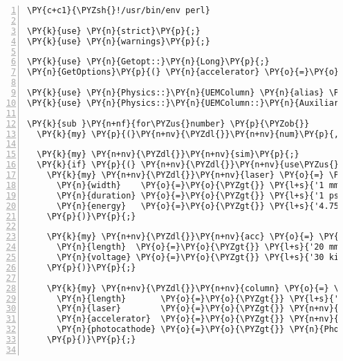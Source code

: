 \begin{Verbatim}[commandchars=\\\{\},numbers=left,firstnumber=1,stepnumber=1]
\PY{c+c1}{\PYZsh{}!/usr/bin/env perl}

\PY{k}{use} \PY{n}{strict}\PY{p}{;}
\PY{k}{use} \PY{n}{warnings}\PY{p}{;}

\PY{k}{use} \PY{n}{Getopt::}\PY{n}{Long}\PY{p}{;}
\PY{n}{GetOptions}\PY{p}{(} \PY{n}{accelerator} \PY{o}{=}\PY{o}{\PYZgt{}} \PY{o}{\PYZbs{}}\PY{k}{my} \PY{n+nv}{\PYZdl{}}\PY{n+nv}{use\PYZus{}acc} \PY{p}{)}\PY{p}{;}

\PY{k}{use} \PY{n}{Physics::}\PY{n}{UEMColumn} \PY{n}{alias} \PY{o}{=}\PY{o}{\PYZgt{}} \PY{p}{[}\PY{l+s+sx}{qw/:standard Pulse/}\PY{p}{]}\PY{p}{;}
\PY{k}{use} \PY{n}{Physics::}\PY{n}{UEMColumn::}\PY{n}{Auxiliary} \PY{l+s+sx}{qw/:materials :constants/}\PY{p}{;}

\PY{k}{sub }\PY{n+nf}{for\PYZus{}number} \PY{p}{\PYZob{}}
  \PY{k}{my} \PY{p}{(}\PY{n+nv}{\PYZdl{}}\PY{n+nv}{num}\PY{p}{,} \PY{n+nv}{\PYZdl{}}\PY{n+nv}{use\PYZus{}acc}\PY{p}{)} \PY{o}{=} \PY{n+nv}{@}\PY{n+nv}{\PYZus{}}\PY{p}{;}

  \PY{k}{my} \PY{n+nv}{\PYZdl{}}\PY{n+nv}{sim}\PY{p}{;}
  \PY{k}{if} \PY{p}{(} \PY{n+nv}{\PYZdl{}}\PY{n+nv}{use\PYZus{}acc} \PY{p}{)} \PY{p}{\PYZob{}}
    \PY{k}{my} \PY{n+nv}{\PYZdl{}}\PY{n+nv}{laser} \PY{o}{=} \PY{n}{Laser}\PY{o}{-}\PY{o}{\PYZgt{}}\PY{k}{new}\PY{p}{(}
      \PY{n}{width}    \PY{o}{=}\PY{o}{\PYZgt{}} \PY{l+s}{'1 mm'}\PY{p}{,}
      \PY{n}{duration} \PY{o}{=}\PY{o}{\PYZgt{}} \PY{l+s}{'1 ps'}\PY{p}{,}
      \PY{n}{energy}   \PY{o}{=}\PY{o}{\PYZgt{}} \PY{l+s}{'4.75 eV'}\PY{p}{,}
    \PY{p}{)}\PY{p}{;}

    \PY{k}{my} \PY{n+nv}{\PYZdl{}}\PY{n+nv}{acc} \PY{o}{=} \PY{n}{DCAccelerator}\PY{o}{-}\PY{o}{\PYZgt{}}\PY{k}{new}\PY{p}{(}
      \PY{n}{length}  \PY{o}{=}\PY{o}{\PYZgt{}} \PY{l+s}{'20 mm'}\PY{p}{,}
      \PY{n}{voltage} \PY{o}{=}\PY{o}{\PYZgt{}} \PY{l+s}{'30 kilovolts'}\PY{p}{,}
    \PY{p}{)}\PY{p}{;}

    \PY{k}{my} \PY{n+nv}{\PYZdl{}}\PY{n+nv}{column} \PY{o}{=} \PY{n}{Column}\PY{o}{-}\PY{o}{\PYZgt{}}\PY{k}{new}\PY{p}{(}
      \PY{n}{length}       \PY{o}{=}\PY{o}{\PYZgt{}} \PY{l+s}{'15 cm'}\PY{p}{,} 
      \PY{n}{laser}        \PY{o}{=}\PY{o}{\PYZgt{}} \PY{n+nv}{\PYZdl{}}\PY{n+nv}{laser}\PY{p}{,}
      \PY{n}{accelerator}  \PY{o}{=}\PY{o}{\PYZgt{}} \PY{n+nv}{\PYZdl{}}\PY{n+nv}{acc}\PY{p}{,}
      \PY{n}{photocathode} \PY{o}{=}\PY{o}{\PYZgt{}} \PY{n}{Photocathode}\PY{o}{-}\PY{o}{\PYZgt{}}\PY{k}{new}\PY{p}{(}\PY{n}{Ta}\PY{p}{)}\PY{p}{,}
    \PY{p}{)}\PY{p}{;}


\end{Verbatim}
